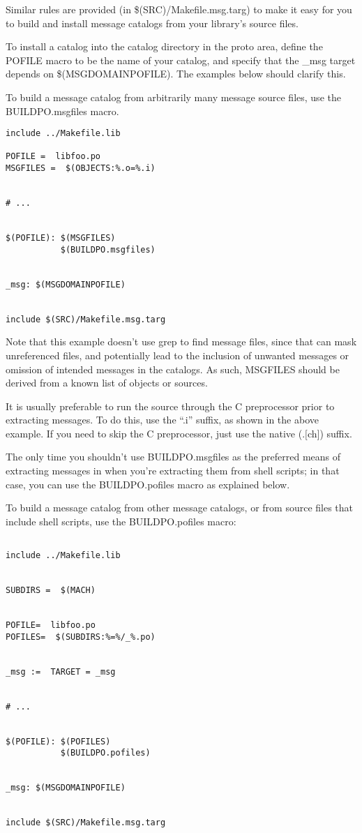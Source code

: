 \documentclass{article}
\begin{document}
\vspace{0.1cm}
Similar rules are provided (in \$(SRC)/Makefile.msg.targ) to make it easy for
you to build and install message catalogs from your library's source files.

To install a catalog into the catalog directory in the proto area, define the
POFILE macro to be the name of your catalog, and specify that the \_msg target
depends on \$(MSGDOMAINPOFILE). The examples below should clarify this.

To build a message catalog from arbitrarily many message source files, use the
BUILDPO.msgfiles macro.

\begin{verbatim}
include ../Makefile.lib

POFILE =  libfoo.po
MSGFILES =  $(OBJECTS:%.o=%.i)


# ...


$(POFILE): $(MSGFILES)
           $(BUILDPO.msgfiles)


_msg: $(MSGDOMAINPOFILE)


include $(SRC)/Makefile.msg.targ

\end{verbatim}

\vspace{0.1cm}
Note that this example doesn't use grep to find message files, since that can
mask unreferenced files, and potentially lead to the inclusion of unwanted
messages or omission of intended messages in the catalogs. As such, MSGFILES
should be derived from a known list of objects or sources.

It is usually preferable to run the source through the C preprocessor prior to
extracting messages. To do this, use the ``.i'' suffix, as shown in the above
example. If you need to skip the C preprocessor, just use the native (.$[$ch$]$)
suffix.

The only time you shouldn't use BUILDPO.msgfiles as the preferred means of
extracting messages in when you're extracting them from shell scripts; in that
case, you can use the BUILDPO.pofiles macro as explained below.

To build a message catalog from other message catalogs, or from source files
that include shell scripts, use the BUILDPO.pofiles macro:

\begin{verbatim}

include ../Makefile.lib


SUBDIRS =  $(MACH)


POFILE=  libfoo.po
POFILES=  $(SUBDIRS:%=%/_%.po)


_msg :=  TARGET = _msg


# ...


$(POFILE): $(POFILES)
           $(BUILDPO.pofiles)


_msg: $(MSGDOMAINPOFILE)


include $(SRC)/Makefile.msg.targ

\end{verbatim}
\end{document}
